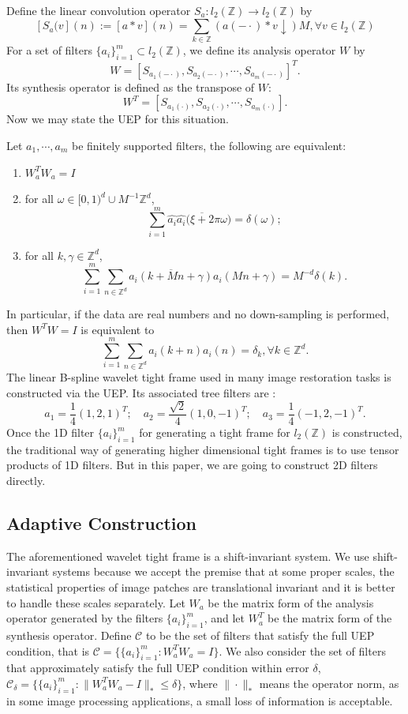 \documentclass[a4paper]{article}
\begin{document}
Define the linear convolution operator $S_a: l_2(\mathbb{Z}) \rightarrow l_2(\mathbb{Z})$ by 
\[
[S_a(v](n):=[a*v](n)=\sum_{k\in\mathbb{Z}} (a(-\cdot)*v \downarrow)M, \forall v\in l_2(\mathbb{Z})
\]
For a set of filters $\{a_i\}_{i=1}^m\subset l_2(\mathbb{Z})$, we define its analysis operator $W$ by 
\[
	W=[S_{a_1(-\cdot)},S_{a_2(-\cdot)},\cdots,S_{a_m(-\cdot)}]^T.
\]
Its synthesis operator is defined as the transpose of $W$:
\[
	W^T=[S_{a_1(\cdot)},S_{a_2(\cdot)},\cdots, S_{a_m(\cdot )}].
\]
Now we may state the UEP for this situation.
\begin{prop}[cite]
Let $a_1,\cdots,a_m$ be finitely supported filters, the following are equivalent:
\begin{enumerate}
\item $W_a^T W_a = I$
\item for all $\omega \in [0,1)^d\cup M^{-1}\mathbb{Z}^d$,
	\[
		\sum_{i=1}^m \hat{a_i}\overline{\hat{a_i}(\xi + 2\pi\omega})=\delta(\omega);
	\]
\item for  all $k,\gamma \in \mathbb{Z}^d$,
	\[
		\sum_{i=1}^m \sum_{n\in\mathbb{Z}^d} \overline{a_i(k+Mn+\gamma)}a_i(Mn+\gamma)=M^{-d}\delta(k).
	\]
\end{enumerate}
\end{prop}
In particular, if the data are real numbers and no down-sampling is performed, then $W^TW=I$ is equivalent to 
\begin{equation}
\label{eq:uep}
	\sum_{i=1}^m \sum_{n\in \mathbb{Z}^d} a_i(k+n) a_i(n)=\delta_k, \forall k\in \mathbb{Z}^d.
\end{equation}
The linear B-spline wavelet tight frame used in many image restoration tasks is constructed via the UEP. Its associated tree filters are :
\[
	a_1=\frac{1}{4}(1,2,1)^T; \quad a_2=\frac{\sqrt{2}}{4}(1,0,-1)^T; \quad a_3=\frac{1}{4}(-1,2,-1)^T.
\]
Once the 1D filter $\{a_i\}_{i=1}^m$ for generating a tight frame for $l_2(\mathbb{Z})$ is constructed, the traditional way of generating higher dimensional tight frames is to use tensor products of 1D filters. But in this paper, we are going to construct 2D filters directly.

\subsection{Adaptive Construction}
The aforementioned wavelet tight frame is a shift-invariant system. We use shift-invariant systems because we accept the premise that at some proper scales, the statistical properties of image patches are translational invariant and it is better to handle these scales separately. Let $W_a$ be the matrix form of the analysis operator generated by the filters $\{a_i\}_{i=1}^m$, and let $W^T_a$ be the matrix form of the synthesis operator. Define $\mathcal{C}$ to be the set of filters that satisfy the full UEP condition, that is $\mathcal{C}=\{ \{a_i\}_{i=1}^m : W_a^TW_a=I\}$. We also consider the set of filters that approximately satisfy the full UEP condition within error $\delta$, $\mathcal{C}_\delta = \{\{a_i\}_{i=1}^m : \|W_a^TW_a -I\|_*\leq \delta\}$, where $\| \cdot \|_*$ means the operator norm, as in some image processing applications,  a small loss of information is acceptable.
\end{document}
